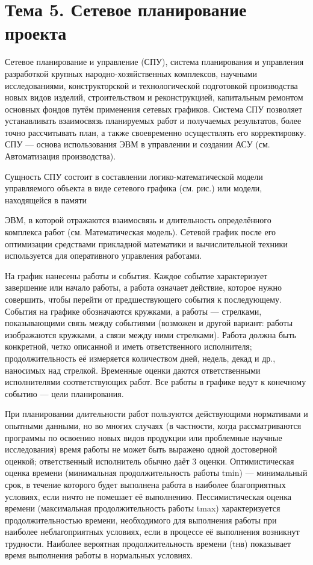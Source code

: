 \section{Тема 5. Сетевое планирование проекта}

Сетевое планирование и управление (СПУ), система планирования и управления разработкой крупных народно-хозяйственных комплексов, научными исследованиями, конструкторской и технологической подготовкой производства новых видов изделий, строительством и реконструкцией, капитальным ремонтом основных фондов путём применения сетевых графиков. Система СПУ позволяет устанавливать взаимосвязь планируемых работ и получаемых результатов, более точно рассчитывать план, а также своевременно осуществлять его корректировку. СПУ — основа использования ЭВМ в управлении и создании АСУ (см. Автоматизация производства).

Сущность СПУ состоит в составлении логико-математической модели управляемого объекта в виде сетевого графика (см. рис.) или модели, находящейся в памяти



ЭВМ, в которой отражаются взаимосвязь и длительность определённого комплекса работ (см. Математическая модель). Сетевой график после его оптимизации средствами прикладной математики и вычислительной техники используется для оперативного управления работами.

На график нанесены работы и события. Каждое событие характеризует завершение или начало работы, а работа означает действие, которое нужно совершить, чтобы перейти от предшествующего события к последующему. События на графике обозначаются кружками, а работы — стрелками, показывающими связь между событиями (возможен и другой вариант: работы изображаются кружками, а связи между ними стрелками). Работа должна быть конкретной, четко описанной и иметь ответственного исполнителя; продолжительность её измеряется количеством дней, недель, декад и др., наносимых над стрелкой. Временные оценки даются ответственными исполнителями соответствующих работ. Все работы в графике ведут к конечному событию — цели планирования.

При планировании длительности работ пользуются действующими нормативами и опытными данными, но во многих случаях (в частности, когда рассматриваются программы по освоению новых видов продукции или проблемные научные исследования) время работы не может быть выражено одной достоверной оценкой; ответственный исполнитель обычно даёт 3 оценки. Оптимистическая оценка времени (минимальная продолжительность работы tmin) — минимальный срок, в течение которого будет выполнена работа в наиболее благоприятных условиях, если ничто не помешает её выполнению. Пессимистическая оценка времени (максимальная продолжительность работы tmax) характеризуется продолжительностью времени, необходимого для выполнения работы при наиболее неблагоприятных условиях, если в процессе её выполнения возникнут трудности. Наиболее вероятная продолжительность времени (tнв) показывает время выполнения работы в нормальных условиях.

